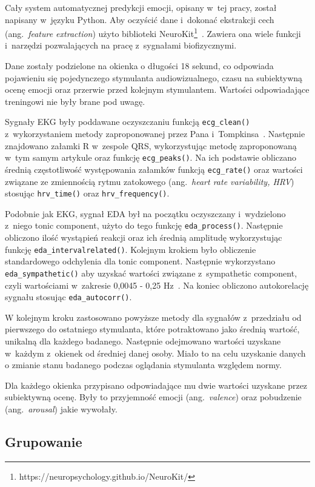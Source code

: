 Cały system automatycznej predykcji emocji, opisany w~tej pracy, został napisany w~języku Python.
Aby oczyścić dane i~dokonać ekstrakcji cech (ang.~\textit{feature extraction}) użyto biblioteki NeuroKit\footnote{https://neuropsychology.github.io/NeuroKit/}~\cite{Neurokit}.
Zawiera ona wiele funkcji i~narzędzi pozwalających na pracę z~sygnałami biofizycznymi.

Dane zostały podzielone na okienka o długości 18 sekund, co odpowiada pojawieniu się pojedynczego stymulanta audiowizualnego, czasu na subiektywną ocenę emocji oraz przerwie przed kolejnym stymulantem.
Wartości odpowiadające treningowi nie były brane pod uwagę.

Sygnały EKG były poddawane oczyszczaniu funkcją \texttt{ecg\_clean()} z~wykorzystaniem metody zaproponowanej przez Pana i~Tompkinsa~\cite{Pan1985}.
Następnie znajdowano załamki R w~zespole QRS, wykorzystując metodę zaproponowaną w~tym samym artykule oraz funkcję \texttt{ecg\_peaks()}.
Na ich podstawie obliczano średnią częstotliwość występowania załamków funkcją \texttt{ecg\_rate()} oraz wartości związane ze zmiennością rytmu zatokowego (ang.~\textit{heart rate variability, HRV}) stosując \texttt{hrv\_time()} oraz \texttt{hrv\_frequency()}.

Podobnie jak EKG, sygnał EDA był na początku oczyszczany i~wydzielono z~niego tonic component, użyto do tego funkcję \texttt{eda\_process()}.
Następnie obliczono ilość wystąpień reakcji oraz ich średnią amplitudę wykorzystując funkcję \texttt{eda\_intervalrelated()}.
Kolejnym krokiem było obliczenie standardowego odchylenia dla tonic component.
Następnie wykorzystano \texttt{eda\_sympathetic()} aby uzyskać wartości związane z~sympathetic component, czyli wartościami w~zakresie 0,0045 - 0,25 Hz~\cite{Posada2016}.
Na koniec obliczono autokorelację sygnału stosując \texttt{eda\_autocorr()}.

W kolejnym kroku zastosowano powyższe metody dla sygnałów z~przedziału od pierwszego do ostatniego stymulanta, które potraktowano jako średnią wartość, unikalną dla każdego badanego.
Następnie odejmowano wartości uzyskane w~każdym z~okienek od średniej danej osoby.
Miało to na celu uzyskanie danych o zmianie stanu badanego podczas oglądania stymulanta względem normy.

Dla każdego okienka przypisano odpowiadające mu dwie wartości uzyskane przez subiektywną ocenę.
Były to przyjemność emocji (ang.~\textit{valence}) oraz pobudzenie (ang.~\textit{arousal}) jakie wywołały.

\subsection{Grupowanie}\label{subsec:grupowanie}

